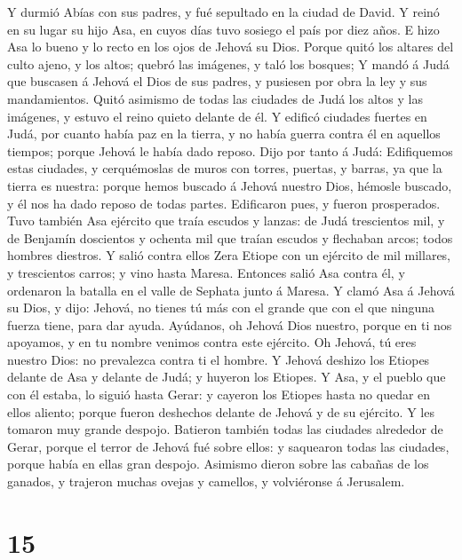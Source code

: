  Y durmió Abías con sus padres, y fué sepultado en la
ciudad de David. Y reinó en su lugar su hijo Asa, en cuyos días tuvo
sosiego el país por diez años.  E hizo Asa lo bueno y lo
recto en los ojos de Jehová su Dios.  Porque quitó los
altares del culto ajeno, y los altos; quebró las imágenes, y taló los
bosques;  Y mandó á Judá que buscasen á Jehová el Dios de
sus padres, y pusiesen por obra la ley y sus mandamientos.
 Quitó asimismo de todas las ciudades de Judá los altos y
las imágenes, y estuvo el reino quieto delante de él.  Y
edificó ciudades fuertes en Judá, por cuanto había paz en la tierra, y
no había guerra contra él en aquellos tiempos; porque Jehová le había
dado reposo.  Dijo por tanto á Judá: Edifiquemos estas
ciudades, y cerquémoslas de muros con torres, puertas, y barras, ya que
la tierra es nuestra: porque hemos buscado á Jehová nuestro Dios,
hémosle buscado, y él nos ha dado reposo de todas partes. Edificaron
pues, y fueron prosperados.  Tuvo también Asa ejército que
traía escudos y lanzas: de Judá trescientos mil, y de Benjamín
doscientos y ochenta mil que traían escudos y flechaban arcos; todos
hombres diestros.  Y salió contra ellos Zera Etiope con un
ejército de mil millares, y trescientos carros; y vino hasta Maresa.
 Entonces salió Asa contra él, y ordenaron la batalla en
el valle de Sephata junto á Maresa.  Y clamó Asa á Jehová
su Dios, y dijo: Jehová, no tienes tú más con el grande que con el que
ninguna fuerza tiene, para dar ayuda. Ayúdanos, oh Jehová Dios nuestro,
porque en ti nos apoyamos, y en tu nombre venimos contra este ejército.
Oh Jehová, tú eres nuestro Dios: no prevalezca contra ti el hombre.
 Y Jehová deshizo los Etiopes delante de Asa y delante de
Judá; y huyeron los Etiopes.  Y Asa, y el pueblo que con
él estaba, lo siguió hasta Gerar: y cayeron los Etiopes hasta no quedar
en ellos aliento; porque fueron deshechos delante de Jehová y de su
ejército. Y les tomaron muy grande despojo.  Batieron
también todas las ciudades alrededor de Gerar, porque el terror de
Jehová fué sobre ellos: y saquearon todas las ciudades, porque había en
ellas gran despojo.  Asimismo dieron sobre las cabañas de
los ganados, y trajeron muchas ovejas y camellos, y volviéronse á
Jerusalem.

\hypertarget{section-14}{%
\section{15}\label{section-14}}

